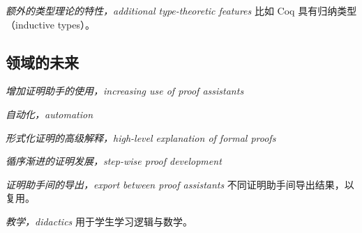\documentclass[UTF8]{article}
\begin{document}
		\textit{额外的类型理论的特性，additional type-theoretic features} 比如 Coq 具有归纳类型（inductive types）。
		
	\subsection{领域的未来}
		\textit{增加证明助手的使用，increasing use of proof assistants}
		
		\textit{自动化，automation}
		
		\textit{形式化证明的高级解释，high-level explanation of formal proofs}
		
		\textit{循序渐进的证明发展，step-wise proof development}
		
		\textit{证明助手间的导出，export between proof assistants} 不同证明助手间导出结果，以复用。
		
		\textit{教学，didactics} 用于学生学习逻辑与数学。
\end{document}
